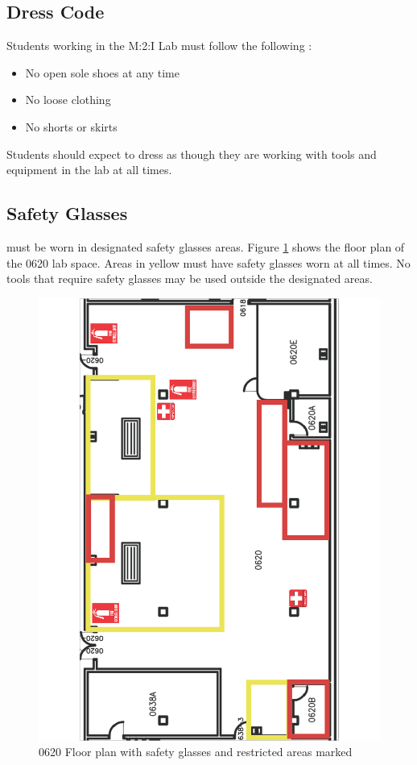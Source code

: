 \subsection{Dress Code}
Students working in the M:2:I Lab must follow the following :

\begin{itemize}
\item No open sole shoes at any time
\item No loose clothing
\item No shorts or skirts
\end{itemize}

Students should expect to dress as though they are working with tools and equipment in the lab at all times.  

\subsection{Safety Glasses}
 must be worn in designated safety glasses areas. Figure \ref{fig:0620_floor_plan} shows the floor plan of the 0620 lab space.  Areas in yellow must have safety glasses worn at all times.  No tools that require safety glasses may be used outside the designated areas.

\begin{figure}[ht]
\centering
\includegraphics[width=5in]{images/0620_Floor_Plan.png}
\caption{0620 Floor plan with safety glasses and restricted areas marked}
\label{fig:0620_floor_plan}
\end{figure}

